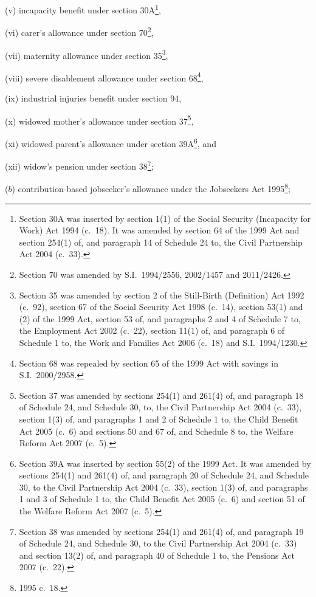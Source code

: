 \documentclass[12pt,a4paper]{article}
\begin{document}
\begin{enumerate}
\begin{enumerate}
(v) incapacity benefit under section 30A\footnote{Section 30A was inserted by section 1(1) of the Social Security (Incapacity for Work) Act 1994 (c.~18). It was amended by section 64 of the 1999 Act and section 254(1) of, and paragraph 14 of Schedule 24 to, the Civil Partnership Act 2004 (c.~33).},

(vi) carer’s allowance under section 70\footnote{Section 70 was amended by S.I.~1994/2556, 2002/1457 and 2011/2426.},

(vii) maternity allowance under section 35\footnote{Section 35 was amended by section 2 of the Still-Birth (Definition) Act 1992 (c.~92), section 67 of the Social Security Act 1998 (c.~14), section 53(1) and (2) of the 1999 Act, section 53 of, and paragraphs 2 and 4 of Schedule 7 to, the Employment Act 2002 (c.~22), section 11(1) of, and paragraph 6 of Schedule 1 to, the Work and Families Act 2006 (c.~18) and S.I.~1994/1230.},

(viii) severe disablement allowance under section 68\footnote{Section 68 was repealed by section 65 of the 1999 Act with savings in S.I.~2000/2958.},

(ix) industrial injuries benefit under section 94,

(x) widowed mother’s allowance under section 37\footnote{Section 37 was amended by sections 254(1) and 261(4) of, and paragraph 18 of Schedule 24, and Schedule 30, to, the Civil Partnership Act 2004 (c.~33), section 1(3) of, and paragraphs 1 and 2 of Schedule 1 to, the Child Benefit Act 2005 (c.~6) and sections 50 and 67 of, and Schedule 8 to, the Welfare Reform Act 2007 (c.~5).},

(xi) widowed parent’s allowance under section 39A\footnote{Section 39A was inserted by section 55(2) of the 1999 Act. It was amended by sections 254(1) and 261(4) of, and paragraph 20 of Schedule 24, and Schedule 30, to the Civil Partnership Act 2004 (c.~33), section 1(3) of, and paragraphs 1 and 3 of Schedule 1 to, the Child Benefit Act 2005 (c.~6) and section 51 of the Welfare Reform Act 2007 (c.~5).}, and

(xii) widow’s pension under section 38\footnote{Section 38 was amended by sections 254(1) and 261(4) of, and paragraph 19 of Schedule 24, and Schedule 30, to the Civil Partnership Act 2004 (c.~33) and section 13(2) of, and paragraph 40 of Schedule 1 to, the Pensions Act 2007 (c.~22).};
\end{enumerate}

($b$) contribution-based jobseeker’s allowance under the Jobseekers Act 1995\footnote{1995 c.~18.};


\end{enumerate}
\end{document}
